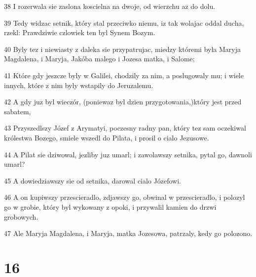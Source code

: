 \par 38 I rozerwala sie zaslona koscielna na dwoje, od wierzchu az do dolu.
\par 39 Tedy widzac setnik, który stal przeciwko niemu, iz tak wolajac oddal ducha, rzekl: Prawdziwie czlowiek ten byl Synem Bozym.
\par 40 Byly tez i niewiasty z daleka sie przypatrujac, miedzy któremi byla Maryja Magdalena, i Maryja, Jakóba malego i Jozesa matka, i Salome;
\par 41 Które gdy jeszcze byly w Galilei, chodzily za nim, a poslugowaly mu; i wiele innych, które z nim byly wstapily do Jeruzalemu.
\par 42 A gdy juz byl wieczór, (poniewaz byl dzien przygotowania,)który jest przed sabatem,
\par 43 Przyszedlszy Józef z Arymatyi, poczesny radny pan, który tez sam oczekiwal królestwa Bozego, smiele wszedl do Pilata, i prosil o cialo Jezusowe.
\par 44 A Pilat sie dziwowal, jezliby juz umarl; i zawolawszy setnika, pytal go, dawnoli umarl?
\par 45 A dowiedziawszy sie od setnika, darowal cialo Józefowi.
\par 46 A on kupiwszy przescieradlo, zdjawszy go, obwinal w przescieradlo, i polozyl go w grobie, który byl wykowany z opoki, i przywalil kamien do drzwi grobowych.
\par 47 Ale Maryja Magdalena, i Maryja, matka Jozesowa, patrzaly, kedy go polozono.

\chapter{16}


